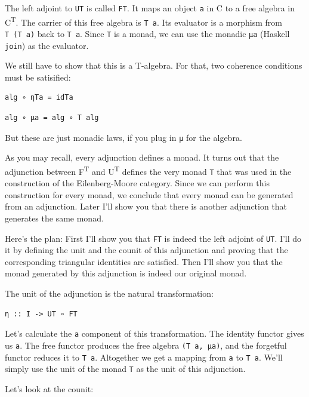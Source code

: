 The left adjoint to \texttt{UT} is called \texttt{FT}. It maps an object
\texttt{a} in C to a free algebra in C\textsuperscript{T}. The carrier
of this free algebra is \texttt{T\ a}. Its evaluator is a morphism from
\texttt{T\ (T\ a)} back to \texttt{T\ a}. Since \texttt{T} is a monad,
we can use the monadic \texttt{μa} (Haskell \texttt{join}) as the
evaluator.

We still have to show that this is a T-algebra. For that, two coherence
conditions must be satisified:

\begin{verbatim}
alg ∘ ηTa = idTa
\end{verbatim}

\begin{verbatim}
alg ∘ μa = alg ∘ T alg
\end{verbatim}

But these are just monadic laws, if you plug in \texttt{μ} for the
algebra.

As you may recall, every adjunction defines a monad. It turns out that
the adjunction between F\textsuperscript{T} and U\textsuperscript{T}
defines the very monad \texttt{T} that was used in the construction of
the Eilenberg-Moore category. Since we can perform this construction for
every monad, we conclude that every monad can be generated from an
adjunction. Later I'll show you that there is another adjunction that
generates the same monad.

Here's the plan: First I'll show you that \texttt{FT} is indeed the left
adjoint of \texttt{UT}. I'll do it by defining the unit and the counit
of this adjunction and proving that the corresponding triangular
identities are satisfied. Then I'll show you that the monad generated by
this adjunction is indeed our original monad.

The unit of the adjunction is the natural transformation:

\begin{verbatim}
η :: I -> UT ∘ FT
\end{verbatim}

Let's calculate the \texttt{a} component of this transformation. The
identity functor gives us \texttt{a}. The free functor produces the free
algebra \texttt{(T\ a,\ μa)}, and the forgetful functor reduces it to
\texttt{T\ a}. Altogether we get a mapping from \texttt{a} to
\texttt{T\ a}. We'll simply use the unit of the monad \texttt{T} as the
unit of this adjunction.

Let's look at the counit:

